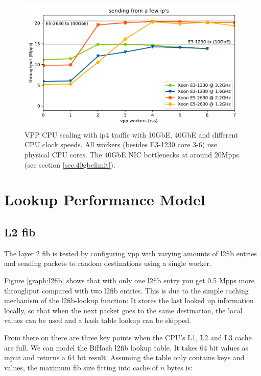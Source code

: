 \begin{figure}[!ht]
\noindent\hspace{0.5mm}\includegraphics[width=\linewidth]{pics/throughput_summary_multicore.pdf}
\caption{VPP CPU scaling with \Ac{ip4} traffic with 10GbE, 40GbE and different CPU clock speeds. All workers (besides E3-1230 core 3-6) use physical CPU cores. The 40GbE NIC bottlenecks at around 20Mpps (see section \ref{sec:40gbelimit}). }
\label{graph:multicore}
\end{figure}


\section{Lookup Performance Model}



\subsection{L2 \Ac{fib}}

The layer 2 \Ac{fib} is tested by configuring \Ac{vpp} with varying
amounts of l2fib entries and sending packets to random destinations
using a single worker.

Figure \ref{graph:l2fib} shows that with only one l2fib entry you get
0.5 Mpps more throughput compared with two l2fib entries. This is due
to the simple caching mechanism of the l2fib-lookup function: It
stores the last looked up information locally, so that when the next
packet goes to the same destination, the local values can be used and
a hash table lookup can be skipped.

From there on there are three key points when the CPU's L1, L2 and L3
cache are full. We can model the BiHash l2fib lookup table. It takes
64 bit values as input and returns a 64 bit result. Assuming the table
only contains keys and values, the maximum \Ac{fib} size fitting into
cache of $n$ bytes is:

